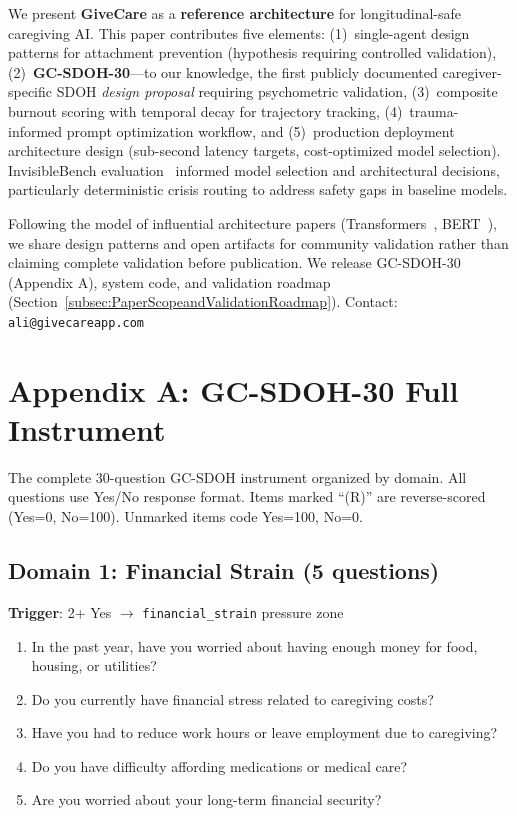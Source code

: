\documentclass{article}
\begin{document}
We present \textbf{GiveCare} as a \textbf{reference architecture} for longitudinal-safe caregiving AI. This paper contributes five elements: (1)~single-agent design patterns for attachment prevention (hypothesis requiring controlled validation), (2)~\textbf{GC-SDOH-30}—to our knowledge, the first publicly documented caregiver-specific SDOH \textit{design proposal} requiring psychometric validation, (3)~composite burnout scoring with temporal decay for trajectory tracking, (4)~trauma-informed prompt optimization workflow, and (5)~production deployment architecture design (sub-second latency targets, cost-optimized model selection). InvisibleBench evaluation~\cite{longitudinalbench} informed model selection and architectural decisions, particularly deterministic crisis routing to address safety gaps in baseline models.

Following the model of influential architecture papers (Transformers~\cite{vaswani2017}, BERT~\cite{devlin2018bert}), we share design patterns and open artifacts for community validation rather than claiming complete validation before publication. We release GC-SDOH-30 (Appendix A), system code, and validation roadmap (Section~\ref{subsec:PaperScopeandValidationRoadmap}). Contact: \texttt{ali@givecareapp.com}

%
\section*{Appendix A: GC-SDOH-30 Full Instrument}

The complete 30-question GC-SDOH instrument organized by domain. All questions use Yes/No response format. Items marked ``(R)'' are reverse-scored (Yes=0, No=100). Unmarked items code Yes=100, No=0.

\subsection*{Domain 1: Financial Strain (5 questions)}
\textbf{Trigger}: 2+ Yes $\rightarrow$ \texttt{financial\_strain} pressure zone

\begin{enumerate}
    \item In the past year, have you worried about having enough money for food, housing, or utilities?
    \item Do you currently have financial stress related to caregiving costs?
    \item Have you had to reduce work hours or leave employment due to caregiving?
    \item Do you have difficulty affording medications or medical care?
    \item Are you worried about your long-term financial security?
\end{enumerate}
\end{document}
